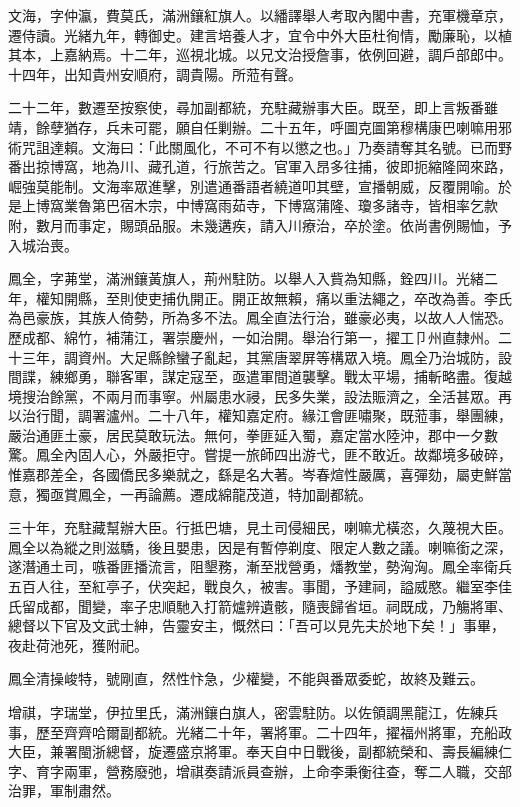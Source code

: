 \begin{pinyinscope}
文海，字仲瀛，費莫氏，滿洲鑲紅旗人。以繙譯舉人考取內閣中書，充軍機章京，遷侍讀。光緒九年，轉御史。建言培養人才，宜令中外大臣杜徇情，勵廉恥，以植其本，上嘉納焉。十二年，巡視北城。以兄文治授詹事，依例回避，調戶部郎中。十四年，出知貴州安順府，調貴陽。所蒞有聲。

二十二年，數遷至按察使，尋加副都統，充駐藏辦事大臣。既至，即上言叛番雖靖，餘孽猶存，兵未可罷，願自任剿辦。二十五年，呼圖克圖第穆構康巴喇嘛用邪術咒詛達賴。文海曰：「此關風化，不可不有以懲之也。」乃奏請奪其名號。已而野番出掠博窩，地為川、藏孔道，行旅苦之。官軍入昂多往捕，彼即扼縮隆岡來路，崛強莫能制。文海率眾進擊，別遣通番語者繞道叩其壁，宣播朝威，反覆開喻。於是上博窩業魯第巴宿木宗，中博窩雨茹寺，下博窩蒲隆、瓊多諸寺，皆相率乞款附，數月而事定，賜頭品服。未幾遘疾，請入川療治，卒於塗。依尚書例賜恤，予入城治喪。

鳳全，字茀堂，滿洲鑲黃旗人，荊州駐防。以舉人入貲為知縣，銓四川。光緒二年，權知開縣，至則使吏捕仇開正。開正故無賴，痛以重法繩之，卒改為善。李氏為邑豪族，其族人倚勢，所為多不法。鳳全直法行治，雖豪必夷，以故人人惴恐。歷成都、綿竹，補蒲江，署崇慶州，一如治開。舉治行第一，擢工⼙州直隸州。二十三年，調資州。大足縣餘蠻子亂起，其黨唐翠屏等構眾入境。鳳全乃治城防，設間諜，練鄉勇，聯客軍，謀定寇至，亟遣軍間道襲擊。戰太平場，捕斬略盡。復越境搜治餘黨，不兩月而事寧。州屬患水祲，民多失業，設法賑濟之，全活甚眾。再以治行聞，調署瀘州。二十八年，權知嘉定府。緣江會匪嘯聚，既蒞事，舉團練，嚴治通匪土豪，居民莫敢玩法。無何，拳匪延入蜀，嘉定當水陸沖，郡中一夕數驚。鳳全內固人心，外嚴拒守。嘗提一旅師四出游弋，匪不敢近。故鄰境多破碎，惟嘉郡差全，各國僑民多樂就之，繇是名大著。岑春煊性嚴厲，喜彈劾，屬吏鮮當意，獨亟賞鳳全，一再論薦。遷成綿龍茂道，特加副都統。

三十年，充駐藏幫辦大臣。行抵巴塘，見土司侵細民，喇嘛尤橫恣，久蔑視大臣。鳳全以為縱之則滋驕，後且嬰患，因是有暫停剃度、限定人數之議。喇嘛銜之深，遂潛通土司，嗾番匪播流言，阻墾務，漸至戕營勇，燔教堂，勢洶洶。鳳全率衛兵五百人往，至紅亭子，伏突起，戰良久，被害。事聞，予建祠，謚威愍。繼室李佳氏留成都，聞變，率子忠順馳入打箭爐辨遺骸，隨喪歸省垣。祠既成，乃觴將軍、總督以下官及文武士紳，告靈安主，慨然曰：「吾可以見先夫於地下矣！」事畢，夜赴荷池死，獲附祀。

鳳全清操峻特，號剛直，然性忭急，少權變，不能與番眾委蛇，故終及難云。

增祺，字瑞堂，伊拉里氏，滿洲鑲白旗人，密雲駐防。以佐領調黑龍江，佐練兵事，歷至齊齊哈爾副都統。光緒二十年，署將軍。二十四年，擢福州將軍，充船政大臣，兼署閩浙總督，旋遷盛京將軍。奉天自中日戰後，副都統榮和、壽長編練仁字、育字兩軍，營務廢弛，增祺奏請派員查辦，上命李秉衡往查，奪二人職，交部治罪，軍制肅然。


\end{pinyinscope}
